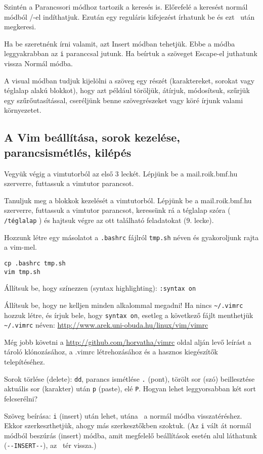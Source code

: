 \documentclass[a4paper]{article}
\newcommand{\code}{\texttt}
\newcommand{\Esc}{\framebox{\texttt{Esc}}}
\newcommand{\Enter}{\framebox{\texttt{Enter}}}
\begin{document}
Szintén a Parancssori módhoz tartozik a keresés is. Előrefelé a keresést
normál módból /-el indíthatjuk. Ezután egy reguláris kifejezést írhatunk
be és ezt \Enter\ után megkeresi.

Ha be szeretnénk írni valamit, azt Insert módban tehetjük. Ebbe a módba
leggyakrabban az \verb!i! paranccsal jutunk. Ha beírtuk a szöveget
Escape-el juthatunk vissza Normál módba.

A visual módban tudjuk kijelölni a szöveg egy részét (karaktereket,
sorokat vagy téglalap alakú blokkot), hogy azt például töröljük,
átírjuk, módosítsuk, szűrjük egy szűrőutasítással, cseréljünk benne
szövegrészeket vagy köré írjunk valami környezetet.

\subsection{A Vim beállítása, sorok kezelése,
parancsismétlés, kilépés}

Vegyük végig a vimtutorból az első 3 leckét.
Lépjünk be a mail.roik.bmf.hu szerverre, futtassuk a vimtutor parancsot.

Tanuljuk meg a blokkok kezelését a vimtutorból.
Lépjünk be a mail.roik.bmf.hu szerverre, futtassuk a vimtutor parancsot,
keressünk rá a téglalap szóra ( \code{/téglalap} ) és hajtsuk végre az
ott található feladatokat (9. lecke).

Hozzunk létre egy másolatot a \code{.bashrc} fájlról \code{tmp.sh} néven és
gyakoroljunk rajta a vim-mel.
\begin{Verbatim}
cp .bashrc tmp.sh
vim tmp.sh
\end{Verbatim}

Állítsuk be, hogy színezzen (syntax highlighting): \code{:syntax on}

Állítsuk be, hogy ne kelljen minden alkalommal megadni! Ha nincs
\verb+~/.vimrc+ hozzuk létre, és írjuk bele, hogy \code{syntax on},
esetleg a következő fájlt menthetjük \verb+~/.vimrc+ néven:
\url{http://www.arek.uni-obuda.hu/linux/vim/vimrc}

Még jobb követni a \url{http://github.com/horvatha/vimrc} oldal alján
levő leírást a tároló klónozásához, a .vimrc létrehozásához és a hasznos
kiegészítők telepítéséhez.

Sorok törlése (delete): \code{dd}, parancs ismétlése \verb+.+ (pont),
törölt sor (szó) beillesztése aktuális sor (karakter) után \code{p}
(paste), elé \code{P}.
Hogyan lehet leggyorsabban két sort felcserélni?

Szöveg beírása: \code{i} (insert) után lehet, utána \Esc\ a normál módba
visszatéréshez. Ekkor szerkeszthetjük, ahogy más szerkesztőkben szoktuk.
(Az \code{i} vált át normál módból beszúrás (insert) módba, amit
megfelelő beállítások esetén alul láthatunk (\verb+--INSERT--+), az
\Esc\ tér vissza.)
\end{document}
